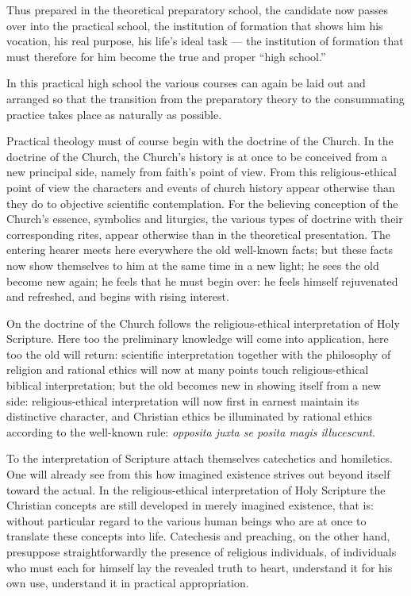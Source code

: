 \documentclass[12pt,a4paper]{book}
\begin{document}
Thus prepared in the theoretical preparatory school, the candidate now passes over into the practical
school, the institution of formation that shows him his vocation, his real purpose, his life's ideal
task --- the institution of formation that must therefore for him become the true and proper ``high
school.''

In this practical high school the various courses can again be laid out and arranged so that the
transition from the preparatory theory to the consummating practice takes place as naturally as
possible.

Practical theology must of course begin with the doctrine of the Church. In the doctrine of the Church,
the Church's history is at once to be conceived from a new principal side, namely from faith's point of
view. From this religious-ethical point of view the characters and events of church history appear
otherwise than they do to objective scientific contemplation. For the believing conception of the
Church's essence, symbolics and liturgics, the various types of doctrine with their corresponding rites,
appear otherwise than in the theoretical presentation. The entering hearer meets here everywhere the old
well-known facts; but these facts now show themselves to him at the same time in a new light; he sees
the old become new again; he feels that he must begin over: he feels himself rejuvenated and refreshed,
and begins with rising interest.

On the doctrine of the Church follows the religious-ethical interpretation of Holy Scripture. Here too
the preliminary knowledge will come into application, here too the old will return: scientific
interpretation together with the philosophy of religion and rational ethics will now at many points
touch religious-ethical biblical interpretation; but the old becomes new in showing itself from a new
side: religious-ethical interpretation will now first in earnest maintain its distinctive character, and
Christian ethics be illuminated by rational ethics according to the well-known rule: \textit{opposita
juxta se posita magis illucescunt}.

To the interpretation of Scripture attach themselves catechetics and homiletics. One will already see
from this how imagined existence strives out beyond itself toward the actual. In the religious-ethical
interpretation of Holy Scripture the Christian concepts are still developed in merely imagined
existence, that is: without particular regard to the various human beings who are at once to translate
these concepts into life. Catechesis and preaching, on the other hand, presuppose straightforwardly the
presence of religious individuals, of individuals who must each for himself lay the revealed truth to
heart, understand it for his own use, understand it in practical appropriation.
\end{document}

